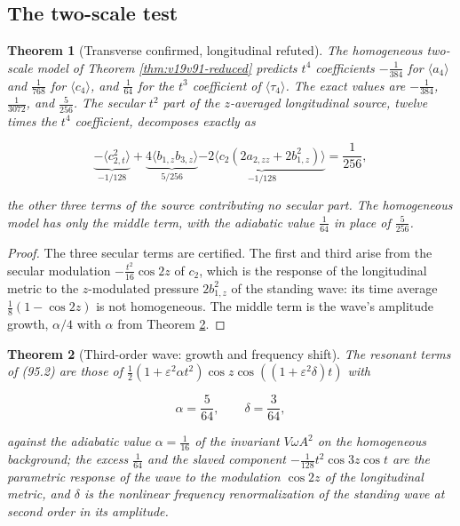 \documentclass[11pt]{article}
\newtheorem{theorem}{Theorem}[section]
\theoremstyle{remark}
\begin{document}
\subsection{The two-scale test}

\begin{theorem}[Transverse confirmed, longitudinal refuted]
\label{thm:v19v92-test}
The homogeneous two-scale model of Theorem \ref{thm:v19v91-reduced}
predicts \(t^4\) coefficients \(-\tfrac1{384}\) for \(\langle a_4\rangle\)
and \(\tfrac1{768}\) for \(\langle c_4\rangle\), and \(\tfrac1{64}\) for
the \(t^3\) coefficient of \(\langle\tau_4\rangle\).  The exact
values are \(-\tfrac1{384}\), \(\tfrac1{3072}\), and \(\tfrac5{256}\).
The secular \(t^2\) part of the \(z\)-averaged longitudinal source,
twelve times the \(t^4\) coefficient, decomposes exactly as

\[
 \underbrace{-\langle c_{2,t}^2\rangle}_{-1/128}
 +\underbrace{4\langle b_{1,z}b_{3,z}\rangle}_{5/256}
 \underbrace{-2\langle c_2(2a_{2,zz}+2b_{1,z}^2)\rangle}_{-1/128}
 =\frac1{256},                                                         \tag{95.4}
\]

the other three terms of the source contributing no secular part.
The homogeneous model has only the middle term, with the adiabatic
value \(\tfrac1{64}\) in place of \(\tfrac5{256}\).
\end{theorem}

\begin{proof}
The three secular terms are certified.  The first and third arise
from the secular modulation \(-\tfrac{t^2}{16}\cos2z\) of \(c_2\),
which is the response of the longitudinal metric to the
\(z\)-modulated pressure \(2b_{1,z}^2\) of the standing wave: its
time average \(\tfrac18(1-\cos2z)\) is not homogeneous.  The middle
term is the wave's amplitude growth, \(\alpha/4\) with \(\alpha\)
from Theorem \ref{thm:v19v92-wave}.
\end{proof}

\begin{theorem}[Third-order wave: growth and frequency shift]
\label{thm:v19v92-wave}
The resonant terms of (95.2) are those of
\(\tfrac12(1+\varepsilon^2\alpha t^2)\cos z\cos((1+\varepsilon^2\delta)t)\)
with

\[
 \alpha=\frac5{64},\qquad\delta=\frac3{64},                             \tag{95.5}
\]

against the adiabatic value \(\alpha=\tfrac1{16}\) of the invariant
\(V\omega A^2\) on the homogeneous background; the excess \(\tfrac1{64}\)
and the slaved component \(-\tfrac1{128}t^2\cos3z\cos t\) are the
parametric response of the wave to the modulation \(\cos2z\) of the
longitudinal metric, and \(\delta\) is the nonlinear frequency
renormalization of the standing wave at second order in its
amplitude.
\end{theorem}
\end{document}
